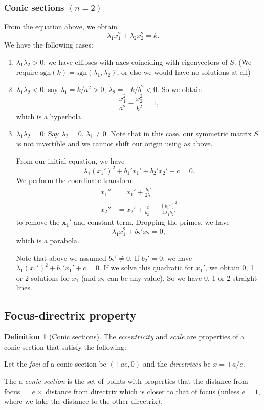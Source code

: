 \documentclass[a4paper]{article}
\theoremstyle{definition}
\newtheorem*{defi}{Definition}
\newcommand{\mb}[1]{\mathbf{#1}}
\begin{document}
\subsubsection{Conic sections \texorpdfstring{$(n = 2)$}{(n = 2)}}
From the equation above, we obtain
\[
\lambda_1x_1^2 + \lambda_2x_2^2 = k.
\]
We have the following cases:
\begin{enumerate}
\item $\lambda_1\lambda_2 > 0$: we have ellipses with axes coinciding with eigenvectors of $S$. (We require $\mathrm{sgn}(k) = \mathrm{sgn}(\lambda_1,\lambda_2)$, or else we would have no solutions at all)
\item $\lambda_1\lambda_2 < 0$: say $\lambda_1 = k/a^2 > 0$, $\lambda_2 = -k/b^2 < 0$. So we obtain
\[
\frac{x_1^2}{a^2} - \frac{x_2^2}{b^2} = 1,
\]
which is a hyperbola.
\item $\lambda_1\lambda_2 = 0$: Say $\lambda_2 = 0$, $\lambda_1\not= 0$. Note that in this case, our symmetric matrix $S$ is not invertible and we cannot shift our origin using as above.

From our initial equation, we have
\[
\lambda_1(x_1')^2 + b_1'x_1' + b_2' x_2' + c = 0.
\]
We perform the coordinate transform
\begin{align*}
  x_1'' &= x_1' + \frac{b_1'}{2\lambda_1}\\
  x_2'' &= x_2' + \frac{c}{b_2'} - \frac{(b_1')^2}{4\lambda_1b_2'}
\end{align*}
to remove the $\mb{x}_1'$ and constant term. Dropping the primes, we have
\[
\lambda_1 x_1^2 + b_2' x_2 = 0,
\]
which is a parabola.

Note that above we assumed $b_2'\not= 0$. If $b_2' = 0$, we have $\lambda_1(x_1')^2 + b_1' x_1' + c = 0$. If we solve this quadratic for $x_1'$, we obtain 0, 1 or 2 solutions for $x_1$ (and $x_2$ can be any value). So we have 0, 1 or 2 straight lines.
\end{enumerate}

\subsection{Focus-directrix property}
\begin{defi}[Conic sections]
  The \emph{eccentricity} and \emph{scale} are properties of a conic section that satisfy the following:

  Let the \emph{foci} of a conic section be $(\pm ae, 0)$ and the \emph{directrices} be $x = \pm a/e$.

  The a \emph{conic section} is the set of points with properties that the distance from focus $= e \times$ distance from directrix which is closer to that of focus (unless $e = 1$, where we take the distance to the other directrix).
\end{defi}
\end{document}
